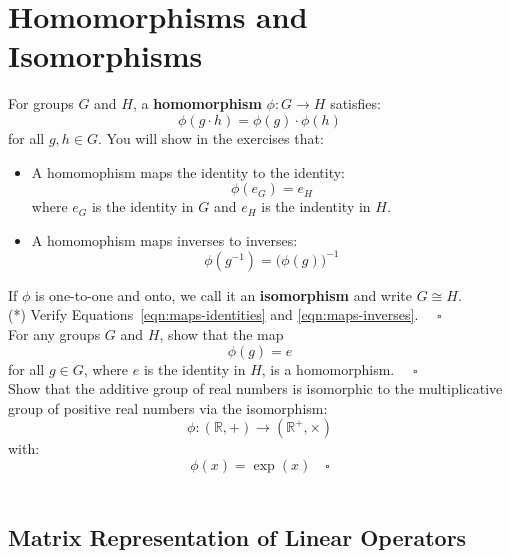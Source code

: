 \documentclass[12pt]{article}
\begin{document}
\section{Homomorphisms and Isomorphisms}

For groups $G$ and $H$, a \textbf{homomorphism} $\phi: G \to H$ satisfies:
\begin{equation*}
  \phi(g \cdot h) = \phi(g) \cdot \phi(h)
\end{equation*}
for all $g,h \in G$.  You will show in the exercises that:
\begin{itemize}
\item A homomophism maps the identity to the identity:
  \begin{equation}
  \label{eqn:maps-identities}
  \phi(e_G) = e_H
\end{equation}
where $e_G$ is the identity in $G$ and $e_H$ is the indentity in $H$.
\item A homomophism maps inverses to inverses:
\begin{equation}
  \label{eqn:maps-inverses}
  \phi(g^{-1}) = \bigl(\phi(g)\bigr)^{-1}
\end{equation}
\end{itemize}
If $\phi$ is one-to-one and onto, we call it an \textbf{isomorphism} and write $G \cong H$.\\[5pt]

\exercise (*) Verify Equations~\ref{eqn:maps-identities} and
\ref{eqn:maps-inverses}. $\quad \square$\\[5pt]

\exercise For any groups $G$ and $H$, show that the map
$$\phi(g) = e$$
for all $g \in G$, where $e$ is the identity in $H$, is a homomorphism.
$\quad \square$\\[5pt]

\exercise Show that the additive group of real numbers is isomorphic to the multiplicative group of positive real numbers via the isomorphism:
$$\phi: (\mathbb{R}, +) \to (\mathbb{R}^+,\times)$$
with:
$$\phi(x) = \exp(x) \quad \square$$\\[5pt]

\subsection*{Matrix Representation of Linear Operators}
\end{document}
